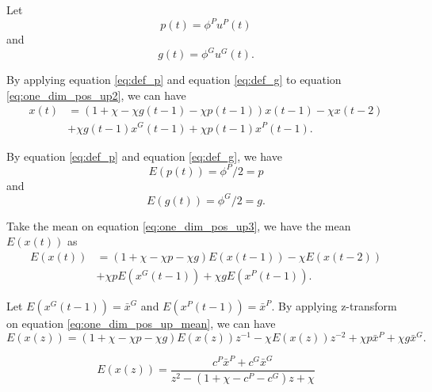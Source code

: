 \documentclass[12pt]{article}
\begin{document}
Let
\begin{equation}
\label{eq:def_p}
p(t) = \phi^{P} u^{P}(t)
\end{equation}
and
\begin{equation}
\label{eq:def_g}
g(t) = \phi^{G} u^{G}(t).
\end{equation}

By applying equation \eqref{eq:def_p} and equation \eqref{eq:def_g} to equation \eqref{eq:one_dim_pos_up2}, we can have
\begin{equation}
\label{eq:one_dim_pos_up3}
\begin{aligned}
x(t) & = ( 1 + \chi - \chi g(t-1) - \chi p(t-1) ) x(t-1) - \chi x(t-2) \\
& + \chi g(t-1) x^{G}(t-1) + \chi p(t-1) x^{P}(t-1).
\end{aligned}
\end{equation}

By equation \eqref{eq:def_p} and equation \eqref{eq:def_g}, we have
\begin{equation}
\label{eq:p_mean}
E( p(t) ) = \phi^{P} / 2 = p
\end{equation}
and
\begin{equation}
\label{eq:g_mean}
E( g(t) ) = \phi^{G} / 2 = g.
\end{equation}

Take the mean on equation \eqref{eq:one_dim_pos_up3}, we have the mean $ E(x(t)) $ as
\begin{equation}
\label{eq:one_dim_pos_up_mean}
\begin{aligned}
E( x(t) ) & = ( 1 + \chi - \chi p - \chi g ) E( x(t-1) ) - \chi E( x(t-2) ) \\ 
& + \chi p E( x^{G}(t-1) ) + \chi g E( x^{P}(t-1) ).
\end{aligned}
\end{equation}

Let $ E( x^{G}(t-1) ) = \bar{x}^{G} $ and $ E( x^{P}(t-1) ) = \bar{x}^{P} $.
By applying z-transform on equation \eqref{eq:one_dim_pos_up_mean}, we can have
\begin{equation}
\label{eq:one_dim_pos_up_z_trans}
E(x(z)) = ( 1 + \chi - \chi p - \chi g ) E(x(z)) z^{-1} - \chi E(x(z)) z^{-2} + \chi p \bar{x}^{P} + \chi g \bar{x}^{G}.
\end{equation}

\begin{equation}
\label{eq:one_dim_pos_up_z_trans1}
E(x(z)) = \frac{c^{P} \bar{x}^{P} + c^{G} \bar{x}^{G}}{z^{2} - (1 + \chi - c^{P} - c^{G} ) z + \chi }
\end{equation}
\end{document}
